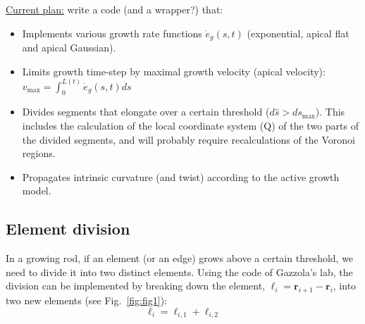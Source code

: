 \documentclass[a4paper, 11pt]{article}
\begin{document}
\noindent \underline{Current plan:} write a code (and a wrapper?) that: 
\begin{itemize}
    \item Implements various growth rate functions $\dot{e}_g(s,t)$ (exponential, apical flat and apical Gaussian). 
    \item Limits growth time-step by maximal growth velocity (apical velocity): $v_{\text{max}}=\int_0^{L(t)}\dot{e}_g(s,t)ds$ 
    \item Divides segments that elongate over a certain threshold ($d\hat{s}>ds_{\text{max}}$). This includes the calculation of the local coordinate system (Q) of the two parts of the divided segments, and will probably require recalculations of the Voronoi regions.
    \item Propagates intrinsic curvature (and twist) according to the active growth model.
\end{itemize}



\newpage

\subsection*{Element division}
In a growing rod, if an element (or an edge) grows above a certain threshold, we need to divide it into two distinct elements. Using the code of Gazzola's lab, the division can be implemented by breaking down the element, $\boldsymbol{\ell}_i=\boldsymbol{r}_{i+1}-\boldsymbol{r}_{i}$, into two new elements (see Fig.~\ref{fig:fig1}):
\begin{equation}
    \boldsymbol{\ell}_i=\boldsymbol{\ell}_{i,1}+\boldsymbol{\ell}_{i,2}
\end{equation}
\end{document}

